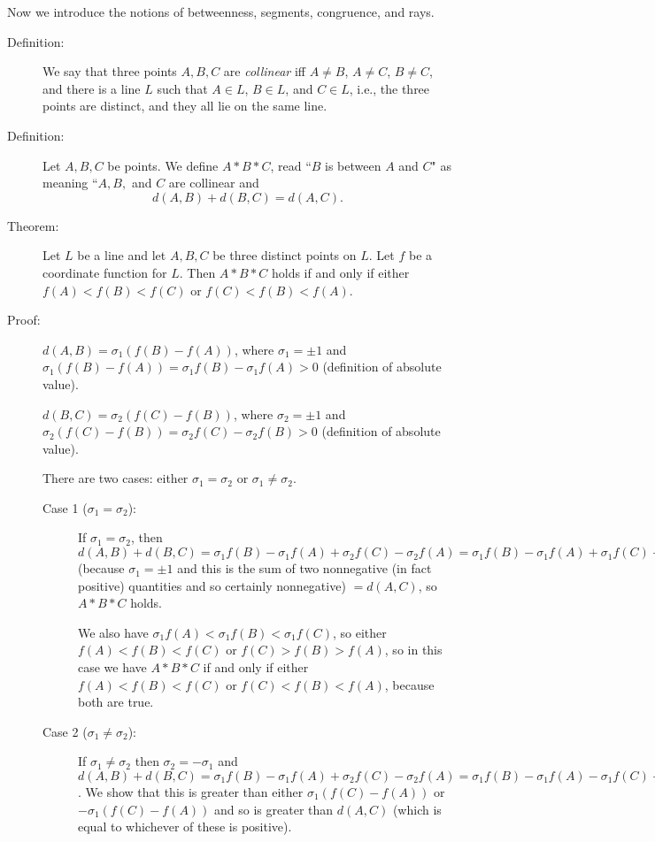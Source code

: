 \documentclass[12pt]{article}
\begin{document}
Now we introduce the notions of betweenness, segments, congruence, and rays.

\begin{description}

\item[Definition:]  We say that three points $A,B,C$ are {\em collinear\/} iff $A \neq B$, $A \neq C$, $B \neq C$, and there is a line $L$ such that $A \in L$, $B \in L$, and $C\in L$, i.e., the three points are distinct, and they all lie on the same line.

\item[Definition:]  Let $A,B,C$ be points.  We define $A*B*C$, read ``$B$ is between $A$ and $C$" as meaning ``$A, B,$ and $C$ are collinear and $$d(A,B) +d(B,C) = d(A,C).$$

\item[Theorem:]  Let $L$ be a line and let $A,B,C$ be three distinct points on $L$.  Let $f$ be a coordinate function for $L$.  Then $A*B*C$ holds if and only if
either $f(A) < f(B) < f(C)$ or $f(C)<f(B)<f(A)$.

\item[Proof:]  $d(A,B) = \sigma_1(f(B) - f(A))$, where $\sigma_1=\pm 1$ and $\sigma_1(f(B) - f(A)) = \sigma_1f(B) -\sigma_1f(A)>0$ (definition of absolute value).

 $d(B,C) = \sigma_2(f(C) - f(B))$, where $\sigma_2=\pm 1$ and $\sigma_2(f(C) - f(B)) = \sigma_2f(C) -\sigma_2f(B) >0$ (definition of absolute value).

There are two cases:  either $\sigma_1 = \sigma_2$ or $\sigma_1 \neq \sigma_2$.

\begin{description}

\item[Case 1 ($\sigma_1 = \sigma_2$):]If $\sigma_1=\sigma_2$, then $d(A,B)+d(B,C) =  \sigma_1f(B) -\sigma_1f(A) + \sigma_2f(C) -\sigma_2f(A) =  \sigma_1f(B) -\sigma_1f(A) + \sigma_1f(C) -\sigma_1f(B) = \sigma_1f(C) -\sigma_1f(A) = \sigma_1(f(C) - f(A)) = |f(C)-f(A)|$ (because $\sigma_1 = \pm 1$ and this is the sum of two nonnegative (in fact positive) quantities and so certainly nonnegative) $=d(A,C)$, so $A*B*C$ holds.

We also have $\sigma_1f(A) < \sigma_1f(B) < \sigma_1f(C)$, so either $f(A)<f(B)<f(C)$ or $f(C)>f(B)>f(A)$, so in this case we have $A*B*C$  if and only if
either $f(A) < f(B) < f(C)$ or $f(C)<f(B)<f(A)$, because both are true.

\item[Case 2 ($\sigma_1 \neq \sigma_2$):]  If $\sigma_1 \neq \sigma_2$ then $\sigma_2 = -\sigma_1$ and $d(A,B)+d(B,C) =  \sigma_1f(B) -\sigma_1f(A) + \sigma_2f(C) -\sigma_2f(A) =  \sigma_1f(B) -\sigma_1f(A) - \sigma_1f(C) +\sigma_1f(B) = 2\sigma_1f(B) - \sigma_1f(A) - \sigma_1f(C)$.  We show that this is greater than either $\sigma_1(f(C)-f(A))$ or
$-\sigma_1(f(C)-f(A))$ and so is greater than $d(A,C)$ (which is equal to whichever of these is positive).


\end{description}
\end{description}
\end{document}
